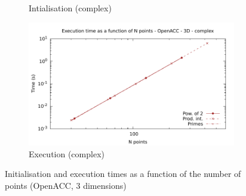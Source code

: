 \documentclass[12pt, a4paper]{article}
\begin{document}
\begin{figure}[H]
\begin{subfigure}{.5\textwidth}
\caption{Intialisation (complex)}
\label{FFTACC3DCI}
\end{subfigure}%
\begin{subfigure}{.5\textwidth}
\centering
\includegraphics[width=.9\linewidth]{graphs/fft-openacc-3d-pow2-c-exec.pdf}
\caption{Execution (complex)}
\label{FFTACC3DCE}
\end{subfigure}
\caption{Initialisation and execution times as a function of the number of points (OpenACC, 3 dimensions)}
\label{FFTCL3D}
\end{figure}
\end{document}
